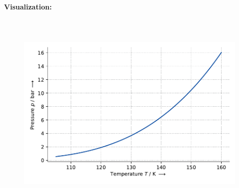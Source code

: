 \textbf{Visualization:}
%
\begin{figure}[!htp]
{\noindent\includegraphics[height=10cm, keepaspectratio]{figs/ref/ref_Methane_VaporPressure_EoSCubic_2.pdf}}
\end{figure}
%

\FloatBarrier
\newpage
